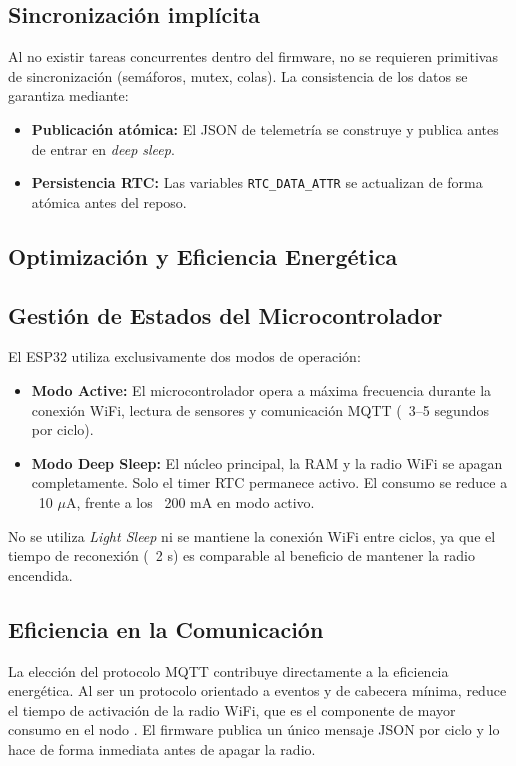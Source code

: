 \documentclass[11pt,a4paper]{article}
\begin{document}
\subsection{Sincronización implícita}
Al no existir tareas concurrentes dentro del firmware, no se requieren primitivas de sincronización (semáforos, mutex, colas). La consistencia de los datos se garantiza mediante:
\begin{itemize}
    \item \textbf{Publicación atómica:} El JSON de telemetría se construye y publica antes de entrar en \textit{deep sleep}.
    \item \textbf{Persistencia RTC:} Las variables \texttt{RTC\_DATA\_ATTR} se actualizan de forma atómica antes del reposo.
\end{itemize}

\subsection{Optimización y Eficiencia Energética}

\subsection{Gestión de Estados del Microcontrolador}
El ESP32 utiliza exclusivamente dos modos de operación:
\begin{itemize}
    \item \textbf{Modo Active:} El microcontrolador opera a máxima frecuencia durante la conexión WiFi, lectura de sensores y comunicación MQTT (~3--5 segundos por ciclo).
    \item \textbf{Modo Deep Sleep:} El núcleo principal, la RAM y la radio WiFi se apagan completamente. Solo el timer RTC permanece activo. El consumo se reduce a ~10 $\mu$A, frente a los ~200 mA en modo activo.
\end{itemize}
No se utiliza \textit{Light Sleep} ni se mantiene la conexión WiFi entre ciclos, ya que el tiempo de reconexión (~2 s) es comparable al beneficio de mantener la radio encendida.

\subsection{Eficiencia en la Comunicación}
La elección del protocolo MQTT contribuye directamente a la eficiencia energética. Al ser un protocolo orientado a eventos y de cabecera mínima, reduce el tiempo de activación de la radio WiFi, que es el componente de mayor consumo en el nodo \citep{mazidi2014}. El firmware publica un único mensaje JSON por ciclo y lo hace de forma inmediata antes de apagar la radio.
\end{document}

